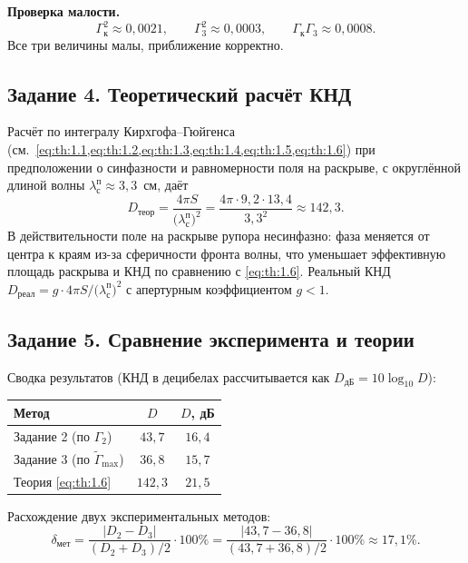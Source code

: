 \noindent\textbf{Проверка малости.}
\begin{equation}
	\Gamma_{\text{к}}^2 \approx 0{,}0021, \qquad
	\Gamma_3^2 \approx 0{,}0003, \qquad
	\Gamma_{\text{к}}\Gamma_3 \approx 0{,}0008.
\end{equation}
Все три величины малы, приближение корректно.

\subsection{Задание 4. Теоретический расчёт КНД}

Расчёт по интегралу Кирхгофа--Гюйгенса (см.~\cref{eq:th:1.1,eq:th:1.2,eq:th:1.3,eq:th:1.4,eq:th:1.5,eq:th:1.6}) при предположении о синфазности и равномерности поля на раскрыве, с округлённой длиной волны ${\lambda^{\text{п}}_{\text{с}}} \approx 3{,}3$~см, даёт
\begin{equation}
	D_{\text{теор}} = \frac{4\pi S}{\bigl(\lambda^{\text{п}}_{\text{с}}\bigr)^2}
	= \frac{4\pi \cdot 9{,}2 \cdot 13{,}4}{3{,}3^2}
	\approx 142{,}3.
\end{equation}
В действительности поле на раскрыве рупора несинфазно: фаза меняется от центра к краям из-за сферичности фронта волны, что уменьшает эффективную площадь раскрыва и КНД по сравнению с \cref{eq:th:1.6}. Реальный КНД $D_{\text{реал}} = g \cdot 4\pi S/\bigl(\lambda^{\text{п}}_{\text{с}}\bigr)^2$ с апертурным коэффициентом $g < 1$.

\subsection{Задание 5. Сравнение эксперимента и теории}

Сводка результатов (КНД в децибелах рассчитывается как $D_{\text{дБ}} = 10\log_{10}D$):

\begin{center}
	\begin{tabular}{lcc}
		\toprule
		Метод & $D$ & $D$, дБ \\
		\midrule
		Задание 2 (по $\Gamma_2$) & $43{,}7$ & $16{,}4$ \\
		Задание 3 (по $\widetilde{\Gamma}_{\max}$) & $36{,}8$ & $15{,}7$ \\
		Теория \cref{eq:th:1.6} & $142{,}3$ & $21{,}5$ \\
		\bottomrule
	\end{tabular}
\end{center}

Расхождение двух экспериментальных методов:
\begin{equation}
	\delta_{\text{мет}} = \frac{|D_2 - D_3|}{(D_2 + D_3)/2} \cdot 100\%
	= \frac{|43{,}7 - 36{,}8|}{(43{,}7 + 36{,}8)/2} \cdot 100\%
	\approx 17{,}1\%.
\end{equation}

